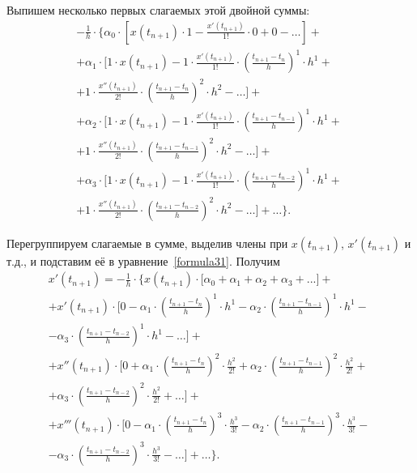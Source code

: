 Выпишем несколько первых слагаемых этой двойной суммы:
\begin{eqnarray}
\label{formula35}
-\frac 1 h\cdot \bigg\{\alpha_0\cdot \left[x(t_{n+1})\cdot 1 - \frac{x'(t_{n+1})}{1!}\cdot 0 + 0 - \dots \right] + \nonumber ~\\
+ \alpha_1 \cdot \bigg[1\cdot x(t_{n+1}) - 1\cdot\frac{x'(t_{n+1})}{1!}\cdot\left(\frac{t_{n+1}-t_n}{h} \right)^1\cdot h^1 + \nonumber ~\\
+ 1\cdot\frac{x''(t_{n+1})}{2!}\cdot\left(\frac{t_{n+1}-t_n}{h} \right)^2\cdot h^2 - \dots \bigg] + \nonumber ~\\
+ \alpha_2 \cdot \bigg[1\cdot x(t_{n+1}) - 1\cdot\frac{x'(t_{n+1})}{1!}\cdot\left(\frac{t_{n+1}-t_{n-1}}{h} \right)^1\cdot h^1 + \nonumber ~\\
+ 1\cdot\frac{x''(t_{n+1})}{2!}\cdot\left(\frac{t_{n+1}-t_{n-1}}{h} \right)^2\cdot h^2 - \dots \bigg] + \nonumber ~\\
+ \alpha_3 \cdot \bigg[1\cdot x(t_{n+1}) - 1\cdot\frac{x'(t_{n+1})}{1!}\cdot\left(\frac{t_{n+1}-t_{n-2}}{h} \right)^1\cdot h^1 + \nonumber ~\\
+ 1\cdot\frac{x''(t_{n+1})}{2!}\cdot\left(\frac{t_{n+1}-t_{n-2}}{h} \right)^2\cdot h^2 - \dots \bigg] + \dots \bigg\}.
\end{eqnarray}

Перегруппируем слагаемые в сумме, выделив члены при $x(t_{n+1})$, $x'(t_{n+1})$ и т.д., и подставим её в уравнение~\eqref{formula31}. Получим
\begin{eqnarray}
\label{formula36}
x'(t_{n+1}) = -\frac 1 h\cdot \bigg\{x(t_{n+1})\cdot \bigg[\alpha_0+\alpha_1+\alpha_2+\alpha_3+...\bigg] + \nonumber ~\\
+ x'(t_{n+1})\cdot\bigg[0-\alpha_1\cdot\left(\frac{t_{n+1}-t_n}{h} \right)^1\cdot h^1-\alpha_2\cdot\left(\frac{t_{n+1}-t_{n-1}}{h} \right)^1\cdot h^1 - \nonumber ~\\
- \alpha_3\cdot\left(\frac{t_{n+1}-t_{n-2}}{h} \right)^1\cdot h^1 - \dots\bigg] + \nonumber ~\\
+ x''(t_{n+1})\cdot\bigg[0+\alpha_1\cdot\left(\frac{t_{n+1}-t_n}{h} \right)^2\cdot\frac{h^2}{2!} +\alpha_2\cdot\left(\frac{t_{n+1}-t_{n-1}}{h} \right)^2\cdot\frac{h^2}{2!} + \nonumber ~\\
+ \alpha_3\cdot\left(\frac{t_{n+1}-t_{n-2}}{h} \right)^2\cdot\frac{h^2}{2!} + \dots\bigg] + \nonumber ~\\
+ x'''(t_{n+1})\cdot\bigg[0-\alpha_1\cdot\left(\frac{t_{n+1}-t_n}{h} \right)^3\cdot\frac{h^3}{3!}-\alpha_2\cdot\left(\frac{t_{n+1}-t_{n-1}}{h} \right)^3\cdot\frac{h^3}{3!} - \nonumber ~\\
- \alpha_3\cdot\left(\frac{t_{n+1}-t_{n-2}}{h} \right)^3\cdot\frac{h^3}{3!} - \dots\bigg] + \dots \bigg\}.
\end{eqnarray}

